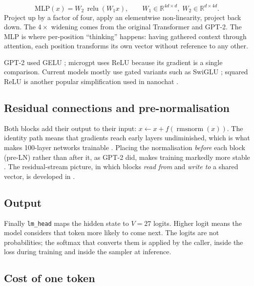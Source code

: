 \documentclass[11pt,letterpaper]{article}
\theoremstyle{remark}
\newcommand{\code}[1]{\lstinline[basicstyle=\ttfamily\small]|#1|}
\newcommand{\R}{\mathbb{R}}
\newcommand{\rmsnorm}{\operatorname{rmsnorm}}
\newcommand{\relu}{\operatorname{relu}}
\begin{document}
\begin{equation}
\mathrm{MLP}(x) = W_2\,\relu(W_1 x),\qquad W_1\in\R^{4d\times d},\; W_2\in\R^{d\times 4d}.
\end{equation}
Project up by a factor of four, apply an elementwise non-linearity, project back down. The $4\times$ widening comes from the original Transformer and GPT-2. The MLP is where per-position ``thinking'' happens: having gathered context through attention, each position transforms its own vector without reference to any other.

GPT-2 used GELU \parencite{hendrycks2016gelu}; microgpt uses ReLU \parencite{nair2010relu,glorot2011relu} because its gradient is a single comparison. Current models mostly use gated variants such as SwiGLU \parencite{shazeer2020glu,touvron2023llama}; squared ReLU \parencite{so2021primer} is another popular simplification used in nanochat \parencite{karpathy2025nanochat}.

\subsection{Residual connections and pre-normalisation}

Both blocks add their output to their input: $x \leftarrow x + f(\rmsnorm(x))$. The identity path means that gradients reach early layers undiminished, which is what makes 100-layer networks trainable \parencite{he2016resnet}. Placing the normalisation \emph{before} each block (pre-LN) rather than after it, as GPT-2 did, makes training markedly more stable \parencite{xiong2020prelayernorm}. The residual-stream picture, in which blocks \emph{read from} and \emph{write to} a shared vector, is developed in \textcite{elhage2021mathematical}.

\subsection{Output}

Finally \code{lm_head} maps the hidden state to $V=27$ logits. Higher logit means the model considers that token more likely to come next. The logits are not probabilities; the softmax that converts them is applied by the caller, inside the loss during training and inside the sampler at inference.

\subsection{Cost of one token}
\end{document}
